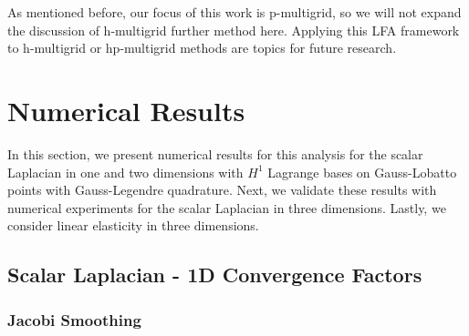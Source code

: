 \documentclass[review]{siamart190516}
\begin{document}
As mentioned before, our focus of this work is p-multigrid, so we will not expand the discussion of h-multigrid further method here.
Applying this LFA framework to h-multigrid or hp-multigrid methods are topics for future research.

\section{Numerical Results}\label{sec:results}

In this section, we present numerical results for this analysis for the scalar Laplacian in one and two dimensions with $H^1$ Lagrange bases on Gauss-Lobatto points with Gauss-Legendre quadrature.
Next, we validate these results with numerical experiments for the scalar Laplacian in three dimensions.
Lastly, we consider linear elasticity in three dimensions.

\subsection{Scalar Laplacian - 1D Convergence Factors}\label{sec:1dresults}

\subsubsection{Jacobi Smoothing}
\end{document}
